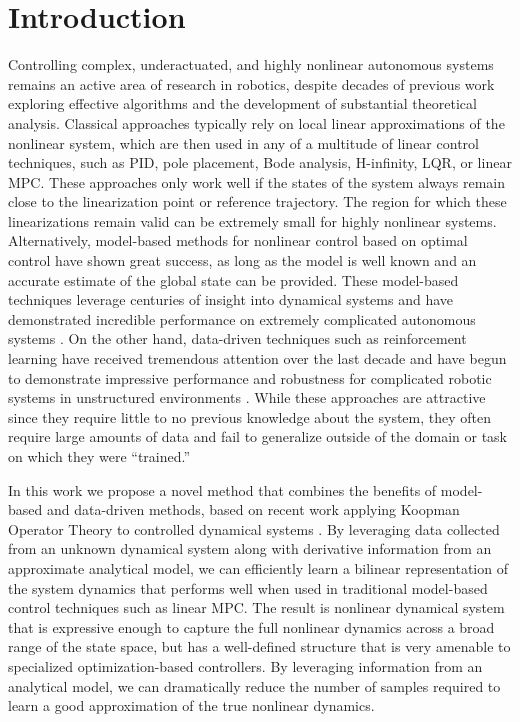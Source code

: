\documentclass{article}
\begin{document}
\section{Introduction}
    Controlling complex, underactuated, and highly nonlinear autonomous systems remains an active area 
    of research in robotics, despite decades of previous work exploring effective algorithms and the 
    development of substantial theoretical analysis. Classical approaches typically rely on local 
    linear approximations of the nonlinear system, which are then used in any of a multitude of linear 
    control techniques, such as PID, pole placement, Bode analysis, H-infinity, LQR, or linear MPC. 
    These approaches only work well if the states of the system always remain close to the linearization 
    point or reference trajectory. The region for which these linearizations remain valid can be extremely 
    small for highly nonlinear systems.
    Alternatively, model-based methods for nonlinear control based on optimal control have shown great 
    success, as long as the 
    model is well known and an accurate estimate of the global state can be provided. These model-based 
    techniques leverage centuries of insight into dynamical systems and have demonstrated incredible 
    performance on extremely complicated autonomous systems .
    On the other hand, data-driven techniques such as reinforcement learning have received tremendous 
    attention over the last decade and have begun to demonstrate impressive performance and robustness 
    for complicated robotic systems in unstructured environments . While these approaches are attractive since they require little to no
    previous knowledge about the system, they often require large amounts of data and 
    fail to generalize outside of the domain or task on which they were ``trained.''
    
    In this work we propose a novel method that combines the benefits of model-based and data-driven methods, based on recent work  applying Koopman Operator Theory to controlled dynamical systems 
    . 
    By leveraging data collected from an unknown dynamical system along with
    derivative information from an approximate analytical model, we can efficiently learn a bilinear 
    representation of the system dynamics that performs well when used in traditional model-based control
    techniques such as linear MPC. The result is nonlinear dynamical system that is expressive enough 
    to capture the full nonlinear dynamics across a broad range of the state space, but has a well-defined 
    structure that is very amenable to specialized optimization-based controllers. By leveraging information
    from an analytical model, we can dramatically reduce the number of samples required to learn a good 
    approximation of the true nonlinear dynamics. 
    
\end{document}
